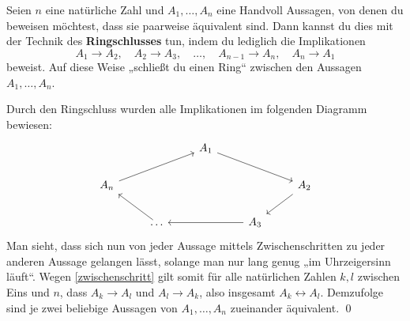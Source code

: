 \begin{sat}[Ringschluss] \label{ringschluss}
Seien $n$ eine natürliche Zahl und $A_1,\dots , A_n$ eine Handvoll Aussagen, von denen du beweisen möchtest, dass sie paarweise äquivalent sind. Dann kannst du dies mit der Technik des \textbf{Ringschlusses} tun, indem du lediglich die Implikationen
\[ A_1\to A_2,\quad A_2\to A_3,\quad \dots ,\quad A_{n-1}\to A_n,\quad A_n\to A_1 \]
beweist. Auf diese Weise „schließt du einen Ring“ zwischen den Aussagen $A_1,\dots , A_n$.
\end{sat}
\begin{bew}
Durch den Ringschluss wurden alle Implikationen im folgenden Diagramm bewiesen:
\[ \begin{tikzcd}
&&& A_1 \ar[rrd] &&& \\
&A_n\ar[rru]&&&& A_2 \ar[ld]& \\
&& \dots \ar[lu] && A_3 \ar[ll]&& 
   \end{tikzcd} \]
Man sieht, dass sich nun von jeder Aussage mittels Zwischenschritten zu jeder anderen Aussage gelangen lässt, solange man nur lang genug „im Uhrzeigersinn läuft“. Wegen \cref{zwischenschritt} gilt somit für alle natürlichen Zahlen $k,l$ zwischen Eins und $n$, dass $A_k\to A_l$ und $A_l\to A_k$, also insgesamt $A_k\leftrightarrow A_l$. Demzufolge sind je zwei beliebige Aussagen von $A_1,\dots , A_n$ zueinander äquivalent. \qed
\end{bew}



